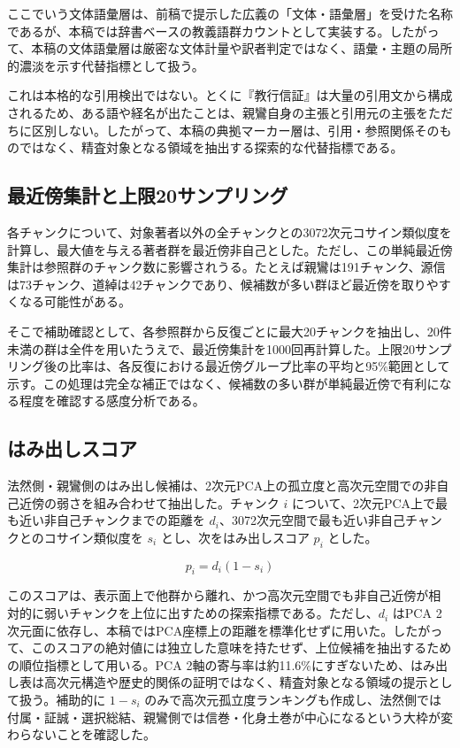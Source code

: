 \documentclass[uplatex,dvipdfmx,11pt,a4paper]{jsarticle}
\begin{document}
ここでいう文体語彙層は、前稿で提示した広義の「文体・語彙層」を受けた名称であるが、本稿では辞書ベースの教義語群カウントとして実装する。したがって、本稿の文体語彙層は厳密な文体計量や訳者判定ではなく、語彙・主題の局所的濃淡を示す代替指標として扱う。

これは本格的な引用検出ではない。とくに『教行信証』は大量の引用文から構成されるため、ある語や経名が出たことは、親鸞自身の主張と引用元の主張をただちに区別しない。したがって、本稿の典拠マーカー層は、引用・参照関係そのものではなく、精査対象となる領域を抽出する探索的な代替指標である。

\subsection{最近傍集計と上限20サンプリング}

各チャンクについて、対象著者以外の全チャンクとの3072次元コサイン類似度を計算し、最大値を与える著者群を最近傍非自己とした。ただし、この単純最近傍集計は参照群のチャンク数に影響されうる。たとえば親鸞は191チャンク、源信は73チャンク、道綽は42チャンクであり、候補数が多い群ほど最近傍を取りやすくなる可能性がある。

そこで補助確認として、各参照群から反復ごとに最大20チャンクを抽出し、20件未満の群は全件を用いたうえで、最近傍集計を1000回再計算した。上限20サンプリング後の比率は、各反復における最近傍グループ比率の平均と95\%範囲として示す。この処理は完全な補正ではなく、候補数の多い群が単純最近傍で有利になる程度を確認する感度分析である。

\subsection{はみ出しスコア}

法然側・親鸞側のはみ出し候補は、2次元PCA上の孤立度と高次元空間での非自己近傍の弱さを組み合わせて抽出した。チャンク \(i\) について、2次元PCA上で最も近い非自己チャンクまでの距離を \(d_i\)、3072次元空間で最も近い非自己チャンクとのコサイン類似度を \(s_i\) とし、次をはみ出しスコア \(p_i\) とした。

\[
  p_i = d_i (1 - s_i)
\]

このスコアは、表示面上で他群から離れ、かつ高次元空間でも非自己近傍が相対的に弱いチャンクを上位に出すための探索指標である。ただし、\(d_i\) はPCA 2次元面に依存し、本稿ではPCA座標上の距離を標準化せずに用いた。したがって、このスコアの絶対値には独立した意味を持たせず、上位候補を抽出するための順位指標として用いる。PCA 2軸の寄与率は約11.6\%にすぎないため、はみ出し表は高次元構造や歴史的関係の証明ではなく、精査対象となる領域の提示として扱う。補助的に \(1-s_i\) のみで高次元孤立度ランキングも作成し、法然側では付属・証誠・選択総結、親鸞側では信巻・化身土巻が中心になるという大枠が変わらないことを確認した。
\end{document}

